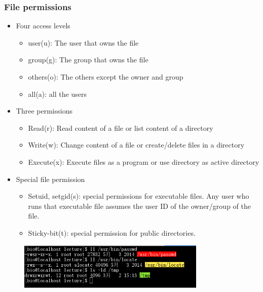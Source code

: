 \documentclass[red]{beamer}
\makeatletter
\newcommand{\tabincell}[2]{\begin{tabular}{@{}#1@{}}#2\end{tabular}}
\makeatother
\begin{document}
\begin{CJK*}{UTF8}{gbsn}
\begin{frame}
\frametitle{File permissions}
\begin{itemize}
	\item Four access levels
	\begin{itemize}	\scriptsize
		\item user(u): The user that owns the file
		\item group(g): The group that owns the file
		\item others(o): The others except the owner and group
		\item all(a): all the users
	\end{itemize}
	\item Three permissions
	\begin{itemize}	\scriptsize
		\item Read(r): Read content of a file or list content of a directory
		\item Write(w): Change content of a file or create/delete files in a
					directory
		\item Execute(x): Execute files as a program or use directory as active 
				directory
	\end{itemize}
	\item Special file permission
	\begin{itemize}	\scriptsize
		\item Setuid, setgid(s): special permissions for executable files. 
			Any user who runs that executable file assumes the user ID of the 
			owner/group of the file.
		\item Sticky-bit(t): special permission for public directories. 
	\end{itemize}
\end{itemize}
\begin{figure}[ht]
\includegraphics[width=0.80\textwidth]{images/setuid.png}
\end{figure}
\end{frame}




\end{CJK*}
\end{document}
